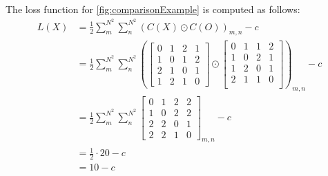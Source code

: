 The loss function for \autoref{fig:comparisonExample} is computed as follows:
\begin{align}
    L(X)&=\frac{1}{2}\sum_m^{N^2}\sum_n^{N^2}(C(X)\odot C(O))_{m,n}-c\nonumber\\
        &=\frac{1}{2}\sum_m^{N^2}\sum_n^{N^2}
        \left(\begin{bmatrix}
        0&1&2&1\\
        1&0&1&2\\
        2&1&0&1\\
        1&2&1&0
    \end{bmatrix}\odot
    \begin{bmatrix}
        0&1&1&2\\
        1&0&2&1\\
        1&2&0&1\\
        2&1&1&0\\
    \end{bmatrix}\right)_{m,n}-c\nonumber\\
        &=\frac{1}{2}\sum_m^{N^2}\sum_n^{N^2}
\begin{bmatrix}
    0&1&2&2\\
    1&0&2&2\\
    2&2&0&1\\
    2&2&1&0
\end{bmatrix}_{m,n}
        -c\nonumber\\
        &=\frac{1}{2}\cdot 20-c\nonumber\\
        &=10-c
        \label{eq:discrete_example}
\end{align}

